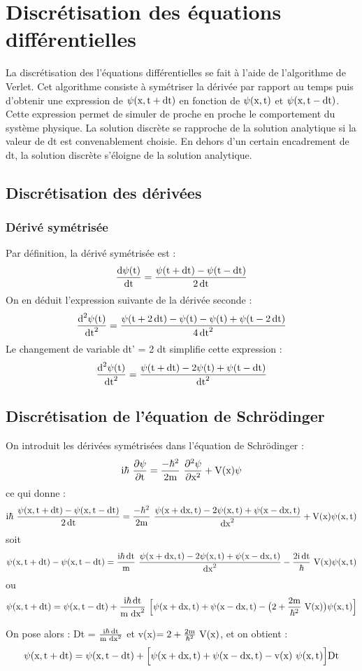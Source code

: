 
\section{Discrétisation des équations différentielles} %
%
La discrétisation des l'équations différentielles se fait à l'aide de l'algorithme de Verlet. Cet algorithme consiste à symétriser la dérivée par rapport au temps puis d'obtenir une expression de $\psi(\text{x},\text{t}+\operatorname{dt})$ en fonction de $\psi(\text{x},\text{t})$ et $\psi(\text{x},\text{t}-\operatorname{dt})$. Cette expression permet de simuler de proche en proche le comportement du système physique. La solution discrète se rapproche de la solution analytique si la valeur de dt est convenablement choisie. En dehors d'un certain encadrement de dt, la solution discrète s'éloigne de la solution analytique.
%
\subsection{Discrétisation des dérivées}
%
\subsubsection{Dérivé symétrisée}
Par définition, la dérivé symétrisée est :
\[
\frac{\text{d}\psi(\text{t})}{\operatorname{dt}}=\frac{\psi(\text{t}+\operatorname{dt})-\psi(\text{t}-\operatorname{dt})}{2\operatorname{dt}}
\]
On en déduit l'expression suivante de la dérivée seconde :
\[
\frac{\text{d}^2\psi(\text{t})}{\operatorname{dt}^2}=\frac{\psi (\text{t}+2\operatorname{dt})-\psi (\text{t})-\psi (\text{t})+\psi(\text{t}-2\operatorname{dt})}{4\operatorname{dt}^2}
\]
Le changement de variable dt' = 2 dt simplifie cette expression :
\[
\frac{\text{d}^2\psi(\text{t})}{\operatorname{dt}^2}=\frac{\psi(\text{t}+\operatorname{dt})-2\psi(\text{t})+\psi(\text{t}-\operatorname{dt})}{\operatorname{dt}^2}
\]

\subsection{Discrétisation de l'équation de Schrödinger}
%
On introduit les dérivées symétrisées dans l'équation de Schrödinger :
\[
\mt{i}\hbar\ \frac{\partial\psi}{\partial\mt{t}} =
\frac{-\hbar^2}{2\mt{m}}\ \frac{\partial^2\psi}{\partial\mt{x}^2}
+\mt{V(x)}\psi
\]
%
ce qui donne :
\[
\mt{i}\hbar\ \frac{\psi(\mt{x},\mt{t}+\dt)-\psi(\mt{x},\mt{t}-\dt)}{2\dt} =
\frac{-\hbar^2}{2\mt{m}}\ \frac{\psi(\mt{x}+\mt{dx},\mt{t})-2\psi(\mt{x},\mt{t})+\psi(\mt{x}-\mt{dx},\mt{t})}{\mt{dx}^2}
+\mt{V(x)}\psi(\mt{x},\mt{t})
\]
%
soit
\[
\psi(\mt{x},\mt{t}+\dt)-\psi(\mt{x},\mt{t}-\dt)=
\frac{\mt{i}\hbar\dt}{\mt{m}}\ \frac{\psi(\mt{x}+\mt{dx},\mt{t})-2\psi(\mt{x},\mt{t})+\psi(\mt{x}-\mt{dx},\mt{t})}{\mt{dx}^2}
-\frac{2\mt{i}\dt}{\hbar}\ \mt{V(x)}\psi(\mt{x},\mt{t})
\]
ou
\[
\psi(\mt{x},\mt{t}+\dt)=\psi(\mt{x},\mt{t}-\dt)+
\frac{\mt{i}\hbar\dt}{\mt{m }\mt{dx}^2}\ \Big[\psi(\mt{x}+\mt{dx},\mt{t})+\psi(\mt{x}-\mt{dx},\mt{t})
-\big(2+\frac{2\mt{m}}{\hbar^2}\ \mt{V(x)}\big)\psi(\mt{x},\mt{t})\Big]
\]

On pose alors : Dt = $\frac{\text{i}\hbar\operatorname{dt}}{\text{m }\text{dx}^2}$ et v(x)$=2+\frac{2\mt{m}}{\hbar^2}\ \mt{V(x)}$, et on obtient :
\[
\psi(\text{x},\text{t}+\operatorname{dt})=\psi(\text{x},\text{t}-\operatorname{dt})+
\Big[\psi(\text{x}+\text{dx},\text{t})+\psi(\text{x}-\text{dx},\text{t})
-\text{v(x) }\psi(\text{x},\text{t})\Big]\text{Dt}
\]
